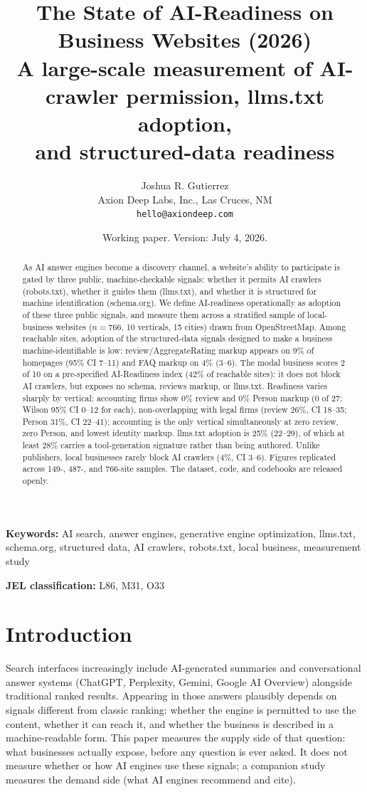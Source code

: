 \documentclass[11pt]{article}
\title{\vspace{-2em}\textbf{The State of AI-Readiness on Business Websites (2026)}\\[0.4em]
\large A large-scale measurement of AI-crawler permission, llms.txt adoption,\\
and structured-data readiness}
\author{Joshua R. Gutierrez\\
\normalsize Axion Deep Labs, Inc., Las Cruces, NM\\
\normalsize \texttt{hello@axiondeep.com}}
\date{Working paper. Version: July 4, 2026.}
\begin{document}
\maketitle

\begin{abstract}
\noindent As AI answer engines become a discovery channel, a website's ability to participate is
gated by three public, machine-checkable signals: whether it permits AI crawlers (robots.txt),
whether it guides them (llms.txt), and whether it is structured for machine identification
(schema.org). We define AI-readiness operationally as adoption of these three public signals, and
measure them across a stratified sample of local-business websites ($n=766$, 10 verticals, 15
cities) drawn from OpenStreetMap. Among reachable sites, adoption of the structured-data signals
designed to make a business machine-identifiable is low: review/AggregateRating markup appears on
9\% of homepages (95\% CI 7--11) and FAQ markup on 4\% (3--6). The modal business scores 2 of 10 on
a pre-specified AI-Readiness index (42\% of reachable sites): it does not block AI crawlers, but
exposes no schema, reviews markup, or llms.txt. Readiness varies sharply by vertical: accounting
firms show 0\% review and 0\% Person markup (0 of 27; Wilson 95\% CI 0--12 for each),
non-overlapping with legal firms (review 26\%, CI 18--35; Person 31\%, CI 22--41); accounting is the
only vertical simultaneously at zero review, zero Person, and lowest identity markup. llms.txt
adoption is 25\% (22--29), of which at least 28\% carries a tool-generation signature rather than
being authored. Unlike publishers, local businesses rarely block AI crawlers (4\%, CI 3--6). Figures
replicated across 149-, 487-, and 766-site samples. The dataset, code, and codebooks are released
openly.
\end{abstract}

\vspace{0.5em}
\noindent\textbf{Keywords:} AI search, answer engines, generative engine optimization, llms.txt,
schema.org, structured data, AI crawlers, robots.txt, local business, measurement study

\noindent\textbf{JEL classification:} L86, M31, O33

\section{Introduction}

Search interfaces increasingly include AI-generated summaries and conversational answer systems
(ChatGPT, Perplexity, Gemini, Google AI Overview) alongside traditional ranked results. Appearing in
those answers plausibly depends on signals different from classic ranking: whether the engine is
permitted to use the content, whether it can reach it, and whether the business is described in a
machine-readable form. This paper measures the supply side of that question: what businesses
actually expose, before any question is ever asked. It does not measure whether or how AI engines
use these signals; a companion study measures the demand side (what AI engines recommend and cite).
\end{document}
